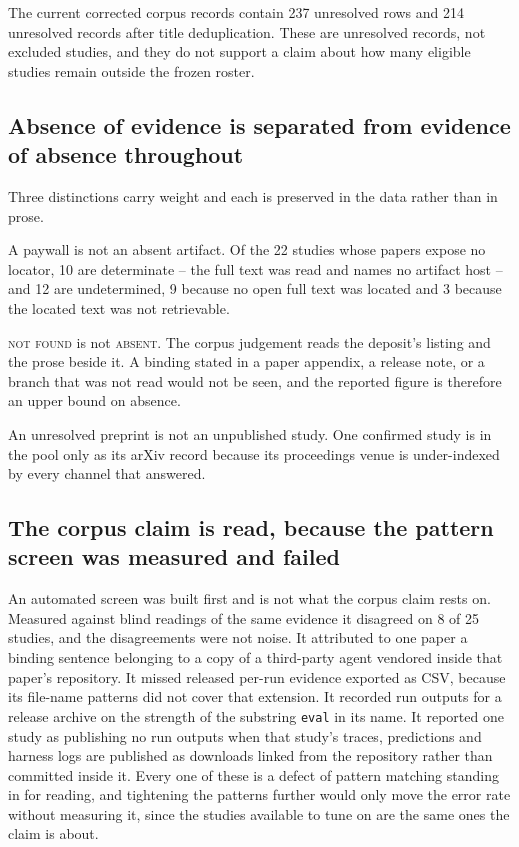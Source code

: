 The current corrected corpus records contain 237 unresolved rows and 214 unresolved records
after title deduplication. These are unresolved records, not excluded studies, and they do not
support a claim about how many eligible studies remain outside the frozen roster.

\subsection{Absence of evidence is separated from evidence of absence throughout}

Three distinctions carry weight and each is preserved in the data rather than in prose.

A paywall is not an absent artifact. Of the 22 studies whose papers expose no locator, 10 are
determinate -- the full text was read and names no artifact host -- and 12 are undetermined,
9 because no open full text was located and 3 because the located text was not retrievable.

\textsc{not found} is not \textsc{absent}. The corpus judgement reads the deposit's listing
and the prose beside it. A binding stated in a paper appendix, a release note, or a branch
that was not read would not be seen, and the reported figure is therefore an upper bound on
absence.

An unresolved preprint is not an unpublished study. One confirmed study is in the pool only
as its arXiv record because its proceedings venue is under-indexed by every channel that
answered.

\subsection{The corpus claim is read, because the pattern screen was measured and failed}

An automated screen was built first and is not what the corpus claim rests on. Measured
against blind readings of the same evidence it disagreed on 8 of 25 studies, and the
disagreements were not noise. It attributed to one paper a binding sentence belonging to a
copy of a third-party agent vendored inside that paper's repository. It missed released
per-run evidence exported as CSV, because its file-name patterns did not cover that
extension. It recorded run outputs for a release archive on the strength of the substring
\texttt{eval} in its name. It reported one study as publishing no run outputs when that
study's traces, predictions and harness logs are published as downloads linked from the
repository rather than committed inside it. Every one of these is a defect of pattern
matching standing in for reading, and tightening the patterns further would only move the
error rate without measuring it, since the studies available to tune on are the same ones the
claim is about.

